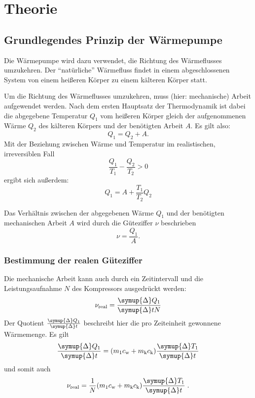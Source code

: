 \section{Theorie} \label{sec:Theorie}

\subsection{Grundlegendes Prinzip der Wärmepumpe}

    Die Wärmepumpe wird dazu verwendet, die Richtung des Wärmeflusses umzukehren.
    Der \enquote{natürliche} Wärmefluss findet in einem abgeschlossenen System von einem heißeren Körper
    zu einem kälteren Körper statt.

    Um die Richtung des Wärmeflusses umzukehren, muss (hier: mechanische) Arbeit aufgewendet werden.
    Nach dem ersten Hauptsatz der Thermodynamik ist dabei die abgegebene Temperatur $Q_1$ vom heißeren Körper
    gleich der aufgenommenen Wärme $Q_2$ des kälteren Körpers und der benötigten Arbeit $A$.
    Es gilt also:
    \begin{equation}
        Q_1 = Q_2 + A .
    \end{equation}
    Mit der Beziehung zwischen Wärme und Temperatur im realistischen, irreversiblen Fall
    \begin{equation}
        \frac{Q_1}{T_1} - \frac{Q_2}{T_2} > 0
    \end{equation}
    ergibt sich außerdem:
    \begin{equation}
        Q_1 = A + \frac{T_1}{T_2} Q_2
    \end{equation}

    Das Verhältnis zwischen der abgegebenen Wärme $Q_1$ und der benötigten mechanischen Arbeit $A$ wird durch die Güteziffer $\nu$
    beschrieben
    \begin{equation}
        \nu = \frac{Q_1}{A}.
    \end{equation}

\subsubsection{Bestimmung der realen Güteziffer}

    Die mechanische Arbeit kann auch durch ein Zeitintervall und die Leistungsaufnahme $N$ des Kompressors ausgedrückt werden:
    \begin{equation}
        \nu_\text{real} = \frac{\symup{\Delta} Q_1}{\symup{\Delta} t N}
    \end{equation}
    Der Quotient $\frac{\symup{\Delta} Q_1}{\symup{\Delta} t}$ beschreibt hier die pro Zeiteinheit gewonnene Wärmemenge. Es gilt
    \begin{equation}
        \frac{\symup{\Delta} Q_1}{\symup{\Delta} t} = (m_1 c_\text{w} + m_\text{k} c_\text{k}) \frac{\symup{\Delta} T_1}{\symup{\Delta} t}
    \end{equation}
    und somit auch
    \begin{equation}
      \label{eqn:reale_gueteziffer}
      \nu_\text{real} = \frac{1}{N} (m_1 c_\text{w} + m_\text{k} c_\text{k}) \frac{\symup{\Delta} T_1}{\symup{\Delta} t} \; .
    \end{equation}

